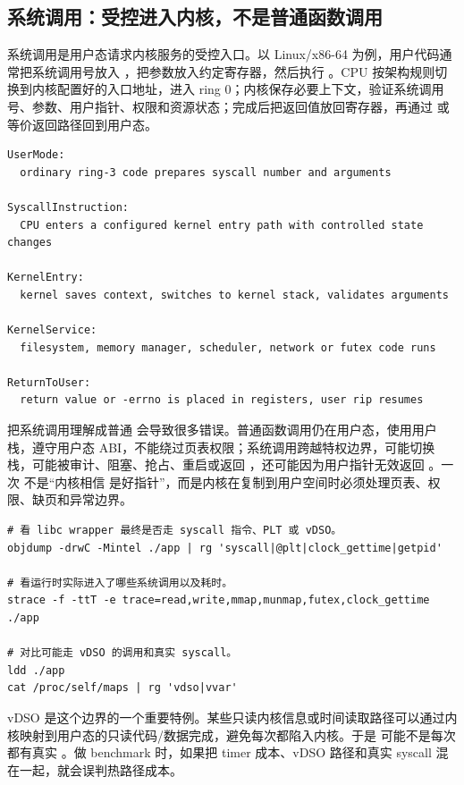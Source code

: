 \subsection{系统调用：受控进入内核，不是普通函数调用}

系统调用是用户态请求内核服务的受控入口。以 Linux/x86-64 为例，用户代码通常把系统调用号放入 ，把参数放入约定寄存器，然后执行 。CPU 按架构规则切换到内核配置好的入口地址，进入 ring 0；内核保存必要上下文，验证系统调用号、参数、用户指针、权限和资源状态；完成后把返回值放回寄存器，再通过  或等价返回路径回到用户态。

\begin{lstlisting}[numbers=none,caption={系统调用的压缩状态机}]
UserMode:
  ordinary ring-3 code prepares syscall number and arguments

SyscallInstruction:
  CPU enters a configured kernel entry path with controlled state changes

KernelEntry:
  kernel saves context, switches to kernel stack, validates arguments

KernelService:
  filesystem, memory manager, scheduler, network or futex code runs

ReturnToUser:
  return value or -errno is placed in registers, user rip resumes
\end{lstlisting}

把系统调用理解成普通  会导致很多错误。普通函数调用仍在用户态，使用用户栈，遵守用户态 ABI，不能绕过页表权限；系统调用跨越特权边界，可能切换栈，可能被审计、阻塞、抢占、重启或返回 ，还可能因为用户指针无效返回 。一次  不是“内核相信  是好指针”，而是内核在复制到用户空间时必须处理页表、权限、缺页和异常边界。

\begin{lstlisting}[numbers=none,caption={观察 syscall 边界的证据}]
# 看 libc wrapper 最终是否走 syscall 指令、PLT 或 vDSO。
objdump -drwC -Mintel ./app | rg 'syscall|@plt|clock_gettime|getpid'

# 看运行时实际进入了哪些系统调用以及耗时。
strace -f -ttT -e trace=read,write,mmap,munmap,futex,clock_gettime ./app

# 对比可能走 vDSO 的调用和真实 syscall。
ldd ./app
cat /proc/self/maps | rg 'vdso|vvar'
\end{lstlisting}

vDSO 是这个边界的一个重要特例。某些只读内核信息或时间读取路径可以通过内核映射到用户态的只读代码/数据完成，避免每次都陷入内核。于是  可能不是每次都有真实 。做 benchmark 时，如果把 timer 成本、vDSO 路径和真实 syscall 混在一起，就会误判热路径成本。

